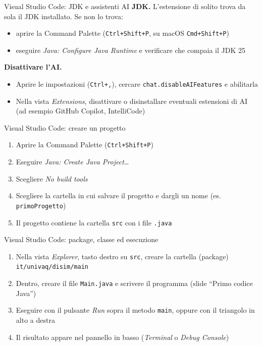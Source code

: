 \documentclass[aspectratio=169,10pt,t]{beamer}
\begin{document}
\begin{frame}{Visual Studio Code: JDK e assistenti AI}
  \textbf{JDK.} L'estensione di solito trova da sola il JDK installato. Se non lo trova:
  \begin{itemize}
    \item aprire la Command Palette (\texttt{Ctrl+Shift+P}, su macOS \texttt{Cmd+Shift+P})
    \item eseguire \emph{Java: Configure Java Runtime} e verificare che compaia il JDK 25
  \end{itemize}
  \vspace{0.5em}
  \textbf{Disattivare l'AI.}
  \begin{itemize}
    \item Aprire le impostazioni (\texttt{Ctrl+,}), cercare \texttt{chat.disableAIFeatures} e abilitarla
    \item Nella vista \emph{Extensions}, disattivare o disinstallare eventuali estensioni di AI (ad esempio GitHub Copilot, IntelliCode)
  \end{itemize}
\end{frame}

\begin{frame}{Visual Studio Code: creare un progetto}
  \begin{enumerate}
    \item Aprire la Command Palette (\texttt{Ctrl+Shift+P})
    \item Eseguire \emph{Java: Create Java Project\ldots}
    \item Scegliere \emph{No build tools}
    \item Scegliere la cartella in cui salvare il progetto e dargli un nome (es. \texttt{primoProgetto})
    \item Il progetto contiene la cartella \texttt{src} con i file \texttt{.java}
  \end{enumerate}
\end{frame}

\begin{frame}{Visual Studio Code: package, classe ed esecuzione}
  \begin{enumerate}
    \item Nella vista \emph{Explorer}, tasto destro su \texttt{src}, creare la cartella (package) \texttt{it/univaq/disim/main}
    \item Dentro, creare il file \texttt{Main.java} e scrivere il programma (slide ``Primo codice Java'')
    \item Eseguire con il pulsante \emph{Run} sopra il metodo \texttt{main}, oppure con il triangolo in alto a destra
    \item Il risultato appare nel pannello in basso (\emph{Terminal} o \emph{Debug Console})
  \end{enumerate}
\end{frame}
\end{document}
